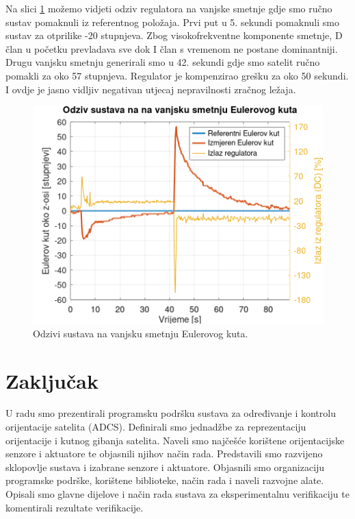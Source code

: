 \documentclass[times, utf8, diplomski, numeric]{templates/template}
\begin{document}
{{        Na slici \ref{fig:angle_reg_dist} možemo vidjeti odziv regulatora na vanjske smetnje gdje smo ručno sustav pomaknuli iz referentnog položaja. Prvi put u 5. sekundi pomaknuli smo sustav za otprilike -20 stupnjeva. Zbog visokofrekventne komponente smetnje, D član u početku prevladava sve dok I član s vremenom ne postane dominantniji. Drugu vanjsku smetnju generirali smo u 42. sekundi gdje smo satelit ručno pomakli za oko 57 stupnjeva. Regulator je kompenzirao grešku za oko 50 sekundi. I ovdje je jasno vidljiv negativan utjecaj nepravilnosti zračnog ležaja. 

        \begin{figure}[htb]
        \centering
        \includegraphics[width=1.0\textwidth]{other/angle_reg_dist.png}
        \caption{Odzivi sustava na vanjsku smetnju Eulerovog kuta.}
        \label{fig:angle_reg_dist}
        \end{figure}
    }
}

\chapter{Zaključak}{
    U radu smo prezentirali programsku podršku sustava za određivanje i kontrolu orijentacije satelita (ADCS). Definirali smo jednadžbe za reprezentaciju orijentacije i kutnog gibanja satelita. Naveli smo najčešće korištene orijentacijske senzore i aktuatore te objasnili njihov način rada. Predstavili smo razvijeno sklopovlje sustava i izabrane senzore i aktuatore. Objasnili smo organizaciju programske podrške, korištene biblioteke, način rada i naveli razvojne alate. Opisali smo glavne dijelove i način rada sustava za eksperimentalnu verifikaciju te komentirali rezultate verifikacije.
}
\end{document}

